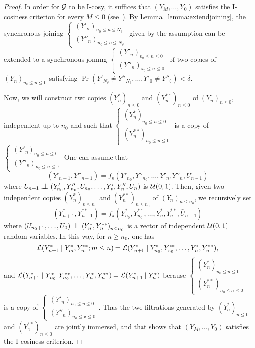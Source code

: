 \documentclass[12pt,a4paper]{article}
\begin{document}
\begin{proof}
In order for $\mathcal{G}$ to be I-cosy, it suffices that 
$(Y_M, \ldots, Y_0)$ satisfies the I-cosiness criterion 
for every $M \leq 0$  (see~\cite{LauXLIII}). 
By Lemma~\ref{lemma:extendjoining}, 
the synchronous joining $\left\{\begin{smallmatrix} {(Y'_n)}_{n_0 \leq n \leq N_\delta} \\ 
{(Y''_n)}_{n_0 \leq n \leq N_\delta}
\end{smallmatrix}\right.$ given by the assumption can be extended 
to a synchronous joining 
$\left\{\begin{smallmatrix} {(Y'_n)}_{n_0 \leq n \leq 0} \\ 
{(Y''_n)}_{n_0 \leq n \leq 0}
\end{smallmatrix}\right.$ of two copies of ${(Y_n)}_{n_0 \leq n \leq 0}$ 
satisfying 
$\Pr(Y'_{N_\delta} \neq Y''_{N_\delta}, \ldots, Y'_0 \neq Y''_0) < \delta$. 

Now, we will construct two copies ${(Y^*_n)}_{n \leq 0}$ and ${(Y^{**}_n)}_{n \leq 0}$ 
of ${(Y_n)}_{n \leq 0}$, independent up to $n_0$ and 
such that 
$\left\{\begin{smallmatrix} {(Y^*_n)}_{n_0 \leq n \leq 0} \\ 
{(Y^{**}_n)}_{n_0 \leq n \leq 0}
\end{smallmatrix}\right.$ is a copy of 
$\left\{\begin{smallmatrix} {(Y'_n)}_{n_0 \leq n \leq 0} \\ 
{(Y''_n)}_{n_0 \leq n \leq 0}
\end{smallmatrix}\right.$
One can assume that 
$$
(Y'_{n+1}, Y''_{n+1}) = f_n(Y'_{n_0}, Y''_{n_0}, \ldots, Y'_n, Y''_n, U_{n+1})
$$ 
where $U_{n+1} \indep (Y'_{n_0}, Y''_{n_0}, U_{n_0}, \ldots, Y'_n, Y''_n, U_n)$ 
is $\mathcal{U}(0,1)$. 
Then, given two independent copies 
${(Y^*_n)}_{n \leq n_0}$ and ${(Y^{**}_n)}_{n \leq n_0}$ 
of ${(Y_n)}_{n \leq n_0}$, we recursively set  
$$
(Y^*_{n+1}, Y^{**}_{n+1}) = f_n(Y^*_{n_0}, Y^{**}_{n_0}, \ldots, Y^*_n, Y^{**}_n, \bar U_{n+1})
$$ 
where 
$(\bar U_{n_0+1}, \ldots, \bar U_{0}) \indep {(Y^*_n, Y^{**}_n)}_{n \leq n_0}$ 
is a vector of independent $\mathcal{U}(0,1)$ random variables.   
In this way, 
for $n \geq n_0$, one has 
$$
\mathcal{L}(Y^*_{n+1} \mid Y^*_m, Y^{**}_m ; m \leq n) = 
\mathcal{L}(Y^*_{n+1} \mid Y^*_{n_0}, Y^{**}_{n_0}, \ldots, Y^*_n, Y^{**}_n),
$$
and $\mathcal{L}(Y^*_{n+1} \mid Y^*_{n_0}, Y^{**}_{n_0}, \ldots, Y^*_n, Y^{**}_n)=\mathcal{L}(Y^*_{n+1} \mid Y^*_n)$ 
because $\left\{\begin{smallmatrix} {(Y^*_n)}_{n_0 \leq n \leq 0} \\ 
{(Y^{**}_n)}_{n_0 \leq n \leq 0}
\end{smallmatrix}\right.$ is a copy of 
$\left\{\begin{smallmatrix} {(Y'_n)}_{n_0 \leq n \leq 0} \\ 
{(Y''_n)}_{n_0 \leq n \leq 0}
\end{smallmatrix}\right.$. 
Thus the two filtrations generated by ${(Y^*_n)}_{n \leq 0}$ and ${(Y^{**}_n)}_{n \leq 0}$ 
are jointly immersed, and that shows that $(Y_M, \ldots, Y_0)$ 
satisfies the I-cosiness criterion. 
\end{proof}
\end{document}
